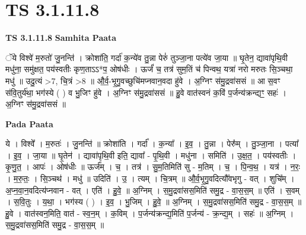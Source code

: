 \documentclass[17pt]{extarticle}
\begin{document}

\section{ TS 3.1.11.8 }

\textbf{TS 3.1.11.8 } \newline
\textbf{Samhita Paata} \newline

ॅये विश्वे॑ म॒रुतो॑ जु॒नन्ति॑ । क्रोशा॑ति॒ गर्दा॑ क॒न्ये॑व तु॒न्ना पेरुं॑ तुञ्जा॒ना पत्ये॑व जा॒या ॥ घृ॒तेन॒ द्यावा॑पृथि॒वी मधु॑ना॒ समु॑क्षत॒ पय॑स्वतीः कृण॒ताऽऽ*प॒ ओष॑धीः । ऊर्जं॑ च॒ तत्र॑ सुम॒तिं च॑ पिन्वथ॒ यत्रा॑ नरो मरुतः सि॒ञ्चथा॒ मधु॑ ॥ उदु॒त्यं >7, चि॒त्रं >8 ॥ औ॒र्व॒-भृ॒गु॒वच्छुचि॑मप्नवान॒वदा हु॑वे । अ॒ग्निꣳ स॑मु॒द्रवा॑ससं ॥ आ स॒वꣳ स॑वि॒तुर्य॑था॒ भग॑स्ये ( ) व भु॒जिꣳ हु॑वे । अ॒ग्निꣳ स॑मु॒द्रवा॑ससं ॥ हु॒वे वात॑स्वनं क॒विं प॒र्जन्य॑क्रन्द्यꣳ॒॒ सहः॑ । अ॒ग्निꣳ स॑मु॒द्रवा॑ससं ॥ \newline

\textbf{Pada Paata} \newline

ये । विश्वे᳚ । म॒रुतः॑ । जु॒नन्ति॑ ॥ क्रोशा॑ति । गर्दा᳚ । क॒न्या᳚ । इ॒व॒ । तु॒न्ना । पेरु᳚म् । तु॒ञ्जा॒ना । पत्या᳚ । इ॒व॒ । जा॒या ॥ घृ॒तेन॑ । द्यावा॑पृथि॒वी इति॒ द्यावा᳚ - पृ॒थि॒वी । मधु॑ना । समिति॑ । उ॒क्ष॒त॒ । पय॑स्वतीः । कृ॒णु॒त॒ । आपः॑ । ओष॑धीः ॥ ऊर्ज᳚म् । च॒ । तत्र॑ । सु॒म॒तिमिति॑ सु - म॒तिम् । च॒ । पि॒न्व॒थ॒ । यत्र॑ । न॒रः॒ । म॒रु॒तः॒ । सि॒ञ्चथ॑ । मधु॑ ॥ उदिति॑ । उ॒ । त्यम् । चि॒त्रम् ॥ औ॒र्व॒भृ॒गु॒वदित्यौ᳚वभृगु - वत् । शुचि᳚म् । अ॒प्न॒वा॒न॒वदित्य॑प्नवान - वत् । एति॑ । हु॒वे॒ ॥ अ॒ग्निम् । स॒मु॒द्रवा॑सस॒मिति॑ समु॒द्र - वा॒स॒स॒म् ॥ एति॑ । स॒वम् । स॒वि॒तुः । य॒था॒ । भग॑स्य ( ) । इ॒व॒ । भु॒जिम् । हु॒वे॒ ॥ अ॒ग्निम् । स॒मु॒द्रवा॑सस॒मिति॑ समु॒द्र - वा॒स॒स॒म् ॥ हु॒वे । वात॑स्वन॒मिति॒ वात॑ - स्व॒न॒म् । क॒विम् । प॒र्जन्य॑क्रन्द्य॒मिति॑ प॒र्जन्य॑ - क्र॒न्द्य॒म् । सहः॑ ॥ अ॒ग्निम् । स॒मु॒द्रवा॑सस॒मिति॑ समु॒द्र - वा॒स॒स॒म् ॥  \newline
\end{document}
